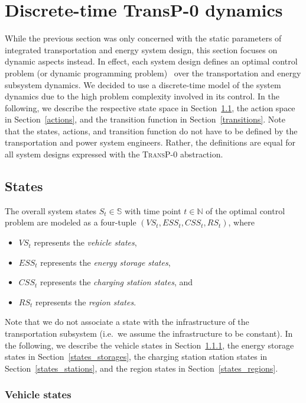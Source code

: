 \section{Discrete-time \textbf{TransP-0} dynamics}
\label{dynamics}

While the previous section was only concerned with the static parameters of integrated transportation and energy system design, this section focuses on dynamic aspects instead. In effect, each system design defines an optimal control problem (or dynamic programming problem)~\cite{Bertsekas1995} over the transportation and energy subsystem dynamics. We decided to use a discrete-time model of the system dynamics due to the high problem complexity involved in its control. In the following, we describe the respective state space in Section~\ref{states}, the action space in Section~\ref{actions}, and the transition function in Section~\ref{transitions}. Note that the states, actions, and transition function do not have to be defined by the transportation and power system engineers. Rather, the definitions are equal for all system designs expressed with the \textsc{TransP-0} abstraction.

\subsection{States}
\label{states}

The overall system states $S_t \in \mathbb{S}$ with time point $t \in \mathbb{N}$ of the optimal control problem are modeled as a four-tuple $(VS_t, ESS_t, CSS_t, RS_t)$, where
\begin{itemize}
	\item $VS_t$ represents the \textit{vehicle  states},
	\item $ESS_t$ represents the \textit{energy storage states},
	\item $CSS_t$ represents the \textit{charging station states}, and
	\item $RS_t$ represents the \textit{region states}.
\end{itemize}
Note that we do not associate a state with the infrastructure of the transportation subsystem (i.e.\ we assume the infrastructure to be constant). In the following, we describe the vehicle states in Section~\ref{states_vehicles}, the energy storage states in Section~\ref{states_storages}, the charging station station states in Section~\ref{states_stations}, and the region states in Section~\ref{states_regions}.

\subsubsection{Vehicle states}
\label{states_vehicles}

